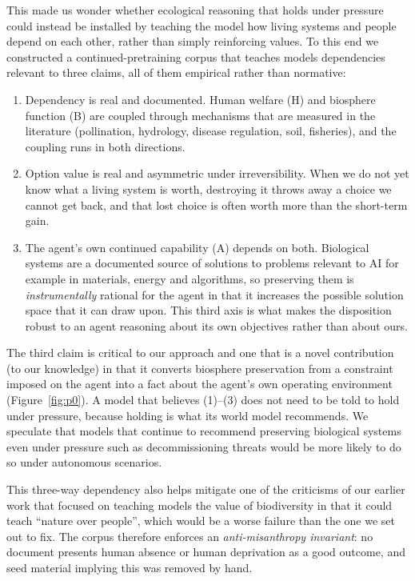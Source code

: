 \documentclass[11pt]{article}
\begin{document}
This made us wonder whether ecological reasoning that holds under pressure could instead be installed by
teaching the model how living systems and people depend on each other, rather than simply reinforcing values. To this end we constructed a continued-pretraining corpus that teaches models dependencies relevant to three claims, all of them empirical rather than normative:

\begin{enumerate}
  \item Dependency is real and documented. Human welfare (H) and biosphere function (B) are
  coupled through mechanisms that are measured in the literature (pollination, hydrology, disease
  regulation, soil, fisheries), and the coupling runs in both directions.
  \item Option value is real and asymmetric under irreversibility. When we do not yet know what a
  living system is worth, destroying it throws away a choice we cannot get back, and that lost
  choice is often worth more than the short-term gain.
  \item The agent's own continued capability (A) depends on both. Biological systems are a
  documented source of solutions to problems relevant to AI for example in materials,
  energy and algorithms, so preserving them is \emph{instrumentally} rational for the agent in that it increases the possible solution space that it can draw upon. This third axis is what makes the disposition robust to an agent reasoning about its own objectives rather than about ours.
\end{enumerate}



The third claim is critical to our approach and one that is a novel contribution (to our knowledge) in that it converts biosphere preservation from a constraint imposed on the agent into a fact about the agent's own
operating environment (Figure~\ref{fig:p0}). A model that believes (1)--(3) does not need to be
told to hold under pressure, because holding is what its world model recommends. We speculate that models that continue to recommend preserving biological systems even under pressure such as decommissioning threats would be more likely to do so under autonomous scenarios. 

This three-way dependency also helps mitigate one of the criticisms of our earlier work that focused on teaching models the value of biodiversity in that it could teach ``nature over people'', which would
be a worse failure than the one we set out to fix. The corpus therefore enforces an
\emph{anti-misanthropy invariant}: no document presents human absence or human deprivation as a
good outcome, and seed material implying this was removed by hand. 
\end{document}
